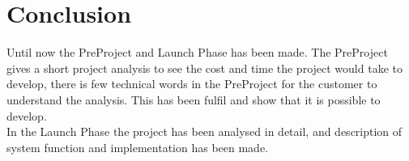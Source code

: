 \chapter{Conclusion}
Until now the PreProject and Launch Phase has been made. The PreProject gives a short project analysis to see the cost and time the project would take to develop, there is few technical words in the PreProject for the customer to understand the analysis. This has been fulfil and show that it is possible to develop.\\
In the Launch Phase the project has been analysed in detail, and description of system function and implementation has been made.